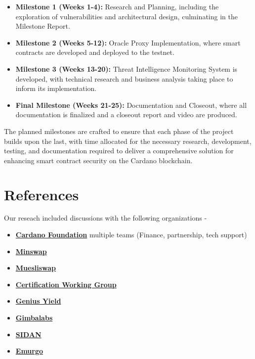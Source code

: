 \documentclass{scrreport}
\begin{document}
\begin{itemize}
  \item \textbf{Milestone 1 (Weeks 1-4):} Research and Planning, including the exploration of vulnerabilities and architectural design, culminating in the Milestone Report.
  \item \textbf{Milestone 2 (Weeks 5-12):} Oracle Proxy Implementation, where smart contracts are developed and deployed to the testnet.
  \item \textbf{Milestone 3 (Weeks 13-20):} Threat Intelligence Monitoring System is developed, with technical research and business analysis taking place to inform its implementation.
  \item \textbf{Final Milestone (Weeks 21-25):} Documentation and Closeout, where all documentation is finalized and a closeout report and video are produced.
\end{itemize}

The planned milestones are crafted to ensure that each phase of the project builds upon the last, with time allocated for the necessary research, development, testing, and documentation required to deliver a comprehensive solution for enhancing smart contract security on the Cardano blockchain.

\appendix
\chapter{References}

Our reseach included discussions with the following organizations - 
\begin{itemize}
    \item \textbf{\href{https://cardanofoundation.org/}{Cardano Foundation}} multiple teams (Finance, partnership, tech support)
    \item \textbf{\href{https://minswap.org/}{Minswap}}
    \item \textbf{\href{https://muesliswap.com/swap}{Muesliswap}}
    \item \textbf{\href{https://github.com/input-output-hk/Certification-working-group}{Certification Working Group}}
    \item \textbf{\href{https://www.geniusyield.co/}{Genius Yield}}
    \item \textbf{\href{https://gimbalabs.com}{Gimbalabs}}
    \item \textbf{\href{http://Sidan.io}{SIDAN}}
    \item \textbf{\href{https://emurgo.io/}{Emurgo}}
\end{itemize}
\end{document}
